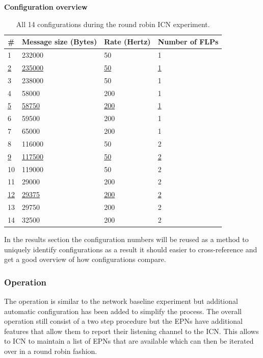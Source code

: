 \documentclass[]{article}
\begin{document}
\begin{table}[H]
	\textbf{Configuration overview}	
	\begin{center}
		\begin{tabular}{ | l | l | l | l | }
			\hline
			\textbf{\#} & \textbf{Message size (Bytes)} & \textbf{Rate (Hertz)} & \textbf{Number of FLPs} \\ \hline
			
			1 & 232000 & 50 & 1 \\ \hline
			\underline{2} & \underline{235000} & \underline{50} & \underline{1} \\ \hline
			3 & 238000 & 50 & 1 \\ \hline
			4 & 58000 & 200 & 1 \\ \hline
			\underline{5} & \underline{58750} & \underline{200} & \underline{1} \\ \hline
			6 & 59500 & 200 & 1 \\ \hline
			7 & 65000 & 200 & 1 \\ \hline
			8 & 116000 & 50 & 2 \\ \hline
			\underline{9} & \underline{117500} & \underline{50} & \underline{2} \\ \hline
			10 & 119000 & 50 & 2 \\ \hline
			11 & 29000 & 200 & 2 \\ \hline
			\underline{12} & \underline{29375} & \underline{200} & \underline{2} \\ \hline
			13 & 29750 & 200 & 2 \\ \hline
			14 & 32500 & 200 & 2 \\ \hline
		\end{tabular}
		\caption{All 14 configurations during the round robin ICN experiment.}
		\label{tab:configoverviewround}
	\end{center}
\end{table}

In the results section the configuration numbers will be reused as a method to uniquely identify configurations as a result it should easier to cross-reference and get a good overview of how configurations compare.

\subsubsection{Operation}
The operation is similar to the network baseline experiment but additional automatic configuration has been added to simplify the process. The overall operation still consist of a two step procedure but the EPNs have additional features that allow them to report their listening channel to the ICN. This allows to ICN to maintain a list of EPNs that are available which can then be iterated over in a round robin fashion.
\end{document}
